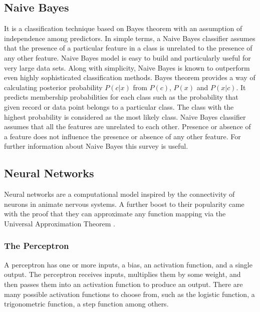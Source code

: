 \documentclass[12pt]{article}
\numberwithin{equation}{section}
\numberwithin{table}{section}
\numberwithin{figure}{section}
\begin{document}
\subsection{Naive Bayes} \label{naive}

It is a classification technique based on Bayes theorem \cite{Triola} with an assumption of independence among predictors. In simple terms, a Naive Bayes classifier assumes that the presence of a particular feature in a class is unrelated to the presence of any other feature. Naive Bayes model is easy to build and particularly useful for very large data sets. Along with simplicity, Naive Bayes is known to outperform even highly sophisticated classification methods. Bayes theorem provides a way of calculating posterior probability $P(c|x)$ from $P(c)$, $P(x)$ and $P(x|c)$. It predicts membership probabilities for each class such as the probability that given record or data point belongs to a particular class.  The class with the highest probability is considered as the most likely class. Naive Bayes classifier assumes that all the features are unrelated to each other. Presence or absence of a feature does not influence the presence or absence of any other feature. For further information about Naive Bayes this survey \cite{Jiang2007} is useful.

\subsection{Neural Networks} \label{neuralnetwork}

Neural networks are a computational model inspired by the connectivity of neurons in animate nervous systems.
A further boost to their popularity came with the proof that they can approximate any function mapping via the Universal Approximation Theorem \cite{Ratsch2004}. 


\subsubsection{The Perceptron} \label{perc}

A perceptron has one or more inputs, a bias, an activation function, and a single output. The perceptron receives inputs, multiplies them by some weight, and then passes them into an activation function to produce an output. There are many possible activation functions to choose from, such as the logistic function, a trigonometric function, a step function among others.
\end{document}
